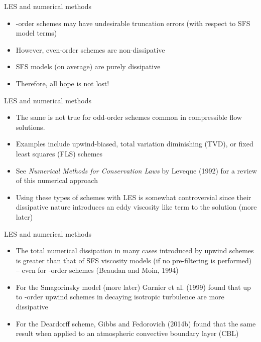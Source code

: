 
\begin{frame}{LES and numerical methods}

\begin{itemize}
\item {}-order schemes may have undesirable truncation errors (with respect to SFS model terms)
\item However, even-order schemes are non-dissipative
\item SFS models (on average) are purely dissipative
\item Therefore, \underline{all hope is not lost}!
\end{itemize}
\end{frame}


\begin{frame}{LES and numerical methods}

\begin{itemize}
\item The same is not true for odd-order schemes common in compressible flow solutions.
\item Examples include upwind-biased,  total variation diminishing (TVD), or fixed least squares (FLS) schemes
\item See \textit{Numerical Methods for Conservation Laws} by Leveque (1992) for a review of this numerical approach
\item Using these types of schemes with LES is somewhat controversial since their dissipative nature introduces an eddy viscosity like term to the solution (more later)

\end{itemize}
\end{frame}


\begin{frame}{LES and numerical methods}

\begin{itemize}
\item The total numerical dissipation in many cases introduced by upwind schemes is greater than that of SFS viscosity models (if no pre-filtering is performed) -- even for -order schemes (Beaudan and Moin, 1994)
\item For the Smagorinsky model (more later) Garnier et al. (1999) found that up to -order upwind schemes in decaying isotropic turbulence are more dissipative
\item For the Deardorff scheme, Gibbs and Fedorovich (2014b) found that the same result when applied to an atmospheric convective boundary layer (CBL)
\end{itemize}
\end{frame}

